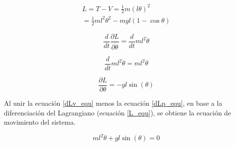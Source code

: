 \begin{large}
\begin{align*}
L = T - V = \frac{1}{2}m(l\theta)^2 \\
= \frac{1}{2}ml^2\theta^2 - mgl(1-\cos \theta)
\end{align*}
\end{large}

\begin{large}
\begin{equation*}
\dfrac{d}{dt} \dfrac{\partial L}{\partial \dot{\theta}} = \dfrac{d}{dt} ml^2\dot{\theta}
\end{equation*}
\end{large}
\begin{large}
\begin{equation} \label{dLv_equ}
\dfrac{d}{dt} ml^2\dot{\theta} = ml^2\ddot{\theta}
\end{equation}
\end{large}
\begin{large}
\begin{equation} \label{dLp_equ}
\dfrac{\partial L}{\partial\theta} = -gl\sin(\theta)
\end{equation}
\end{large}
Al unir la ecuación \ref{dLv_equ} menos la ecuación \ref{dLp_equ}, en base a la diferenciación del Lagrangiano (ecuación \ref{L_equ}), se obtiene la ecuación de movimiento del sistema.
\begin{large}
\begin{equation}
ml^2\ddot{\theta} + gl\sin(\theta) = 0
\end{equation}
\end{large}